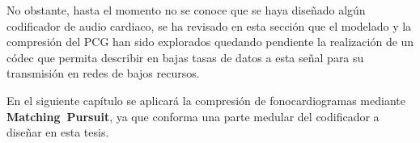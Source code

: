  No obstante, hasta el momento no se conoce que se haya diseñado algún codificador de audio cardiaco, se ha revisado en esta sección que el modelado y la compresión del PCG han sido explorados quedando pendiente la realización de un códec que permita describir en bajas tasas de datos a esta señal para su transmisión en redes de bajos recursos.
 
  En el siguiente capítulo se aplicará la compresión de fonocardiogramas mediante \mbox{\textbf{Matching Pursuit}}, ya que conforma una parte medular del codificador a diseñar en esta tesis.
  


